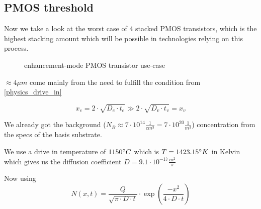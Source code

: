 \subsection{PMOS threshold}\label{pmos_dimensioning}
Now we take a look at the worst case of 4 stacked PMOS transistors, which is the highest stacking amount which will be possible in technologies relying on this process.

\begin{figure}[H]
	\centering
	\begin{circuitdiagram}{20}{20}
	\end{circuitdiagram}
	\caption{enhancement-mode PMOS transistor use-case}
\end{figure}

$\approx 4 \mu m$ come mainly from the need to fulfill the condition from \autoref{physics_drive_in}

\begin{equation}
x_e = 2 \cdot \sqrt{D_e \cdot t_e} \gg 2 \cdot \sqrt{D_v \cdot t_v} = x_v
\end{equation}

We already got the background ($N_B \approx 7 \cdot 10^{14} \frac{1}{cm^3}=7 \cdot 10^{20} \frac{1}{m^3}$) concentration from the specs of the basis substrate.

We use a drive in temperature of $1150 \degree C$ which is  $T = 1423.15 \degree K$ in Kelvin which gives us the diffusion coefficient $D=9.1 \cdot 10^{-17}  \frac{m^2}{s}$

Now using
\begin{equation}
N(x,t)
=
\frac{Q}{\sqrt{\pi\cdot D \cdot t}} \cdot \exp\left(\frac{-x^2}{4 \cdot D \cdot t}\right)
\end{equation}

